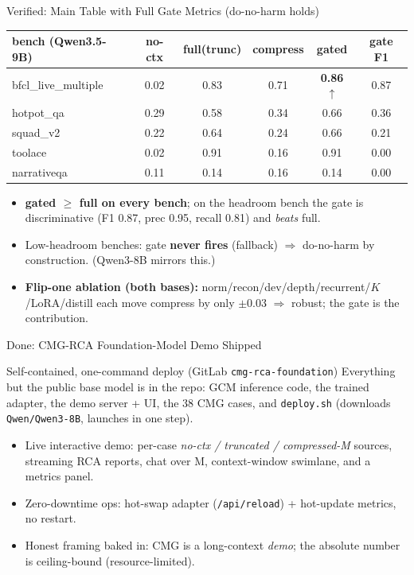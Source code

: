 \begin{frame}{Verified: Main Table with Full Gate Metrics (do-no-harm holds)}
  \scriptsize
  \begin{table}\centering
    \begin{tabular}{lccccc}
      \toprule
      bench (Qwen3.5-9B) & no-ctx & full(trunc) & compress & \textbf{gated} & gate F1 \\
      \midrule
      bfcl\_live\_multiple & 0.02 & 0.83 & 0.71 & \textbf{0.86}$\uparrow$ & 0.87 \\
      hotpot\_qa & 0.29 & 0.58 & 0.34 & 0.66 & 0.36 \\
      squad\_v2 & 0.22 & 0.64 & 0.24 & 0.66 & 0.21 \\
      toolace & 0.02 & 0.91 & 0.16 & 0.91 & 0.00 \\
      narrativeqa & 0.11 & 0.14 & 0.16 & 0.14 & 0.00 \\
      \bottomrule
    \end{tabular}
  \end{table}
  \begin{itemize}
    \item \textbf{gated $\ge$ full on every bench}; on the headroom bench the gate is discriminative (F1 0.87, prec 0.95, recall 0.81) and \emph{beats} full.
    \item Low-headroom benches: gate \textbf{never fires} (fallback) $\Rightarrow$ do-no-harm by construction. (Qwen3-8B mirrors this.)
    \item \textbf{Flip-one ablation (both bases):} norm/recon/dev/depth/recurrent/$K$/LoRA/distill each move compress by only $\pm$0.03 $\Rightarrow$ robust; the gate is the contribution.
  \end{itemize}
\end{frame}

\begin{frame}{Done: CMG-RCA Foundation-Model Demo Shipped}
  \small
  \begin{block}{Self-contained, one-command deploy (GitLab \texttt{cmg-rca-foundation})}
    Everything but the public base model is in the repo: GCM inference code, the trained adapter, the demo
    server + UI, the 38 CMG cases, and \texttt{deploy.sh} (downloads \texttt{Qwen/Qwen3-8B}, launches in one step).
  \end{block}
  \begin{itemize}
    \item Live interactive demo: per-case \emph{no-ctx / truncated / compressed-M} sources, streaming RCA reports, chat over M, context-window swimlane, and a metrics panel.
    \item Zero-downtime ops: hot-swap adapter (\texttt{/api/reload}) + hot-update metrics, no restart.
    \item Honest framing baked in: CMG is a long-context \emph{demo}; the absolute number is ceiling-bound (resource-limited).
  \end{itemize}
\end{frame}

